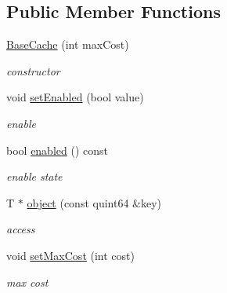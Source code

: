\subsection*{Public Member Functions}
\begin{DoxyCompactItemize}
\item 
\mbox{\label{class_base_cache_a2a92fffe10ea1138532725bb28df6f0f}} 
\hyperlink{class_base_cache_a2a92fffe10ea1138532725bb28df6f0f}{Base\+Cache} (int max\+Cost)
\begin{DoxyCompactList}\small\item\em constructor \end{DoxyCompactList}\item 
\mbox{\label{class_base_cache_aaf9947083d535dcbc706beb3ac64dee8}} 
void \hyperlink{class_base_cache_aaf9947083d535dcbc706beb3ac64dee8}{set\+Enabled} (bool value)
\begin{DoxyCompactList}\small\item\em enable \end{DoxyCompactList}\item 
\mbox{\label{class_base_cache_ae90d3fa39573ea13095145686408c60a}} 
bool \hyperlink{class_base_cache_ae90d3fa39573ea13095145686408c60a}{enabled} () const
\begin{DoxyCompactList}\small\item\em enable state \end{DoxyCompactList}\item 
\mbox{\label{class_base_cache_ad0dd0c51de3691e6104973189fdb3ffd}} 
T $\ast$ \hyperlink{class_base_cache_ad0dd0c51de3691e6104973189fdb3ffd}{object} (const quint64 \&key)
\begin{DoxyCompactList}\small\item\em access \end{DoxyCompactList}\item 
\mbox{\label{class_base_cache_a185cf14c3a371a714715a8f36a3e0302}} 
void \hyperlink{class_base_cache_a185cf14c3a371a714715a8f36a3e0302}{set\+Max\+Cost} (int cost)
\begin{DoxyCompactList}\small\item\em max cost \end{DoxyCompactList}\end{DoxyCompactItemize}


